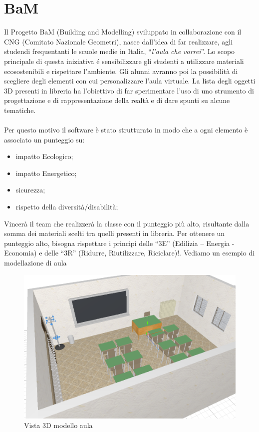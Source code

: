 \section{BaM}
\label{sec:chapter_4_section_1}
Il Progetto BaM (Building and Modelling) sviluppato in collaborazione con il CNG (Comitato Nazionale Geometri),
nasce dall'idea di far realizzare, agli studendi frequentanti le scuole medie in Italia,
``\emph{l'aula che vorrei}''. Lo scopo principale di questa iniziativa \'e sensibilizzare gli studenti a utilizzare
materiali ecosostenibili e rispettare l'ambiente.
Gli alunni avranno poi la possibilità di scegliere degli elementi con cui personalizzare l’aula virtuale.
La lista degli oggetti 3D presenti in libreria ha l’obiettivo di far sperimentare l’uso di uno strumento di progettazione
e di rappresentazione della realtà e di dare spunti su alcune tematiche.\\
\\Per questo motivo il software è stato strutturato in modo che a ogni elemento è associato un punteggio su:
\begin{itemize}
\item impatto Ecologico;
\item impatto Energetico;
\item sicurezza;
\item rispetto della diversità/disabilità;
\end{itemize}
Vincerà il team che realizzerà la classe con il punteggio più alto, risultante dalla somma dei materiali scelti
tra quelli presenti in libreria. Per ottenere un punteggio alto, bisogna rispettare i principi delle
“3E” (Edilizia – Energia - Economia) e delle “3R” (Ridurre, Riutilizzare, Riciclare)!. Vediamo un esempio
di modellazione di aula
\begin{figure}[htbp] %
   \centering
   \includegraphics[width=1\linewidth]{images/3d-school-2}
   \caption{Vista 3D modello aula}
   \label{fig:revit}
   \end{figure}

